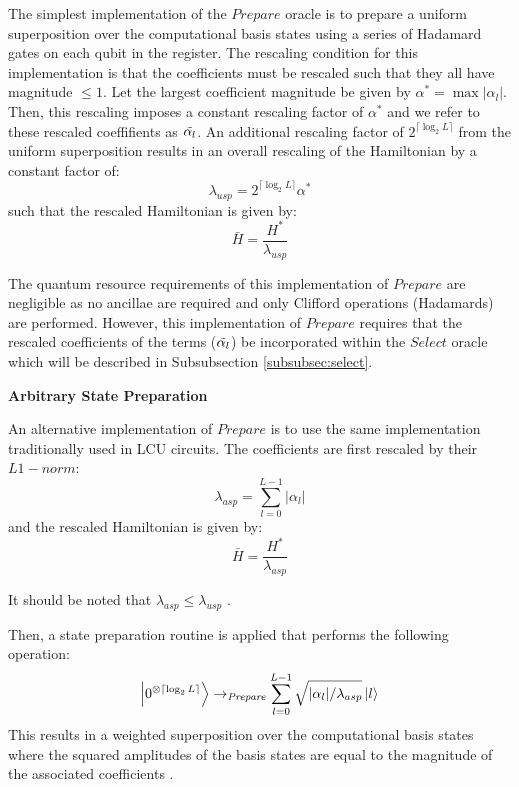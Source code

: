 The simplest implementation of the $\textit{Prepare}$ oracle is to prepare a uniform superposition over the computational basis states using a series of Hadamard gates on each qubit in the register.
The rescaling condition for this implementation is that the coefficients must be rescaled such that they all have magnitude $\leq 1$.
Let the largest coefficient magnitude be given by $\alpha^* = \max{|\alpha_l|}$.
Then, this rescaling imposes a constant rescaling factor of $\alpha^*$ and we refer to these rescaled coeffifients as $\Tilde{\alpha_l}$.
An additional rescaling factor of $2^{\lceil \log_2{L} \rceil}$ from the uniform superposition results in an overall rescaling of the Hamiltonian by a constant factor of:
\begin{equation}
    \lambda_{usp} = 2^{\lceil \log_2{L} \rceil} \alpha^*
\end{equation}
such that the rescaled Hamiltonian is given by:
\begin{equation}
    \bar{H} = \frac{H^*}{\lambda_{usp}}
\end{equation}

The quantum resource requirements of this implementation of $\textit{Prepare}$ are negligible as no ancillae are required and only Clifford operations (Hadamards) are performed.
However, this implementation of $\textit{Prepare}$ requires that the rescaled coefficients of the terms ($\Tilde{\alpha_l}$) be incorporated within the $\textit{Select}$ oracle which will be described in Subsubsection \ref{subsubsec:select}.

\textbf{Arbitrary State Preparation}

An alternative implementation of $\textit{Prepare}$ is to use the same implementation traditionally used in LCU circuits.
The coefficients are first rescaled by their $L1-norm$:
\begin{equation}
    \lambda_{asp} = \sum_{l=0}^{L-1} |\alpha_l|
\end{equation}
and the rescaled Hamiltonian is given by:
\begin{equation}
    \bar{H} = \frac{H^*}{\lambda_{asp}}
\end{equation}

It should be noted that $\lambda_{asp} \leq \lambda_{usp}$  .

Then, a state preparation routine is applied that performs the following operation:
\begin{equation}
    \ket{0^{\otimes \lceil \log_2{L} \rceil}} \rightarrow_{\textit{Prepare}} \sum_{l = 0}^{L-1} \sqrt{|\alpha_l| / \lambda_{asp}} \ket{l}
\end{equation}
This results in a weighted superposition over the computational basis states where the squared amplitudes of the basis states are equal to the magnitude of the associated coefficients .

